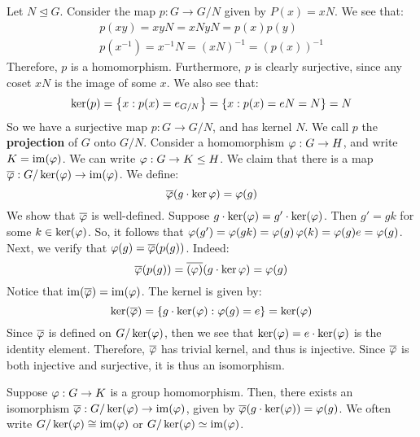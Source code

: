 Let $ N \trianglelefteq G $. Consider the map $ p : G \rightarrow G/N $ given by $ P(x) = xN $.
We see that:
\begin{gather*}
    p(xy) = xyN = xNyN = p(x)p(y) \\
    p(x^{-1}) = x^{-1}N = (xN)^{-1} = (p(x))^{-1}
\end{gather*}
Therefore, $ p $ is a homomorphism. Furthermore, $ p $ is clearly surjective,
since any coset $ xN $ is the image of some $ x $. We also see that:
\begin{equation*}
    \ker(p) = \left\{{x : p(x) = e_{G/N}}\right\} = \left\{{x : p(x) = eN = N}\right\} = N
\end{equation*}
So we have a surjective map $ p: G \rightarrow G/N $, and has kernel $ N $.
We call $ p $ the \textbf{projection} of $ G $ onto $ G/N $. \vsp
%
Consider a homomorphism $ \operatorname{\varphi}: G \rightarrow H $, and write $ K = \operatorname{im}(\operatorname{\varphi}) $.
We can write $ \operatorname{\varphi} : G \rightarrow K \leq H $.
We claim that there is a map $ \overline{\operatorname{\varphi}} : G/\ker(\operatorname{\varphi}) \rightarrow \operatorname{im}(\operatorname{\varphi}) $.
We define:
\begin{equation*}
    \overline{\operatorname{\varphi}}(g \cdot \ker\operatorname{\varphi}) = \operatorname{\varphi}(g)
\end{equation*}
We show that $ \overline{\operatorname{\varphi}} $ is well-defined. Suppose $ g \cdot \ker(\operatorname{\varphi}) = g' \cdot \ker(\operatorname{\varphi}) $.
Then $ g' = gk $ for some $ k \in \ker(\operatorname{\varphi}) $.
So, it follows that $ \operatorname{\varphi}(g') = \operatorname{\varphi}(gk) = \operatorname{\varphi}(g)\operatorname{\varphi}(k) = \operatorname{\varphi}(g)e = \operatorname{\varphi}(g) $.
Next, we verify that $ \operatorname{\varphi}(g) = \overline{\operatorname{\varphi}}(p(g)) $. Indeed:
\begin{equation*}
    \overline{\operatorname{\varphi}}(p(g)) = \overline{(\operatorname{\varphi})}(g \cdot \ker \operatorname{\varphi}) = \operatorname{\varphi}(g)
\end{equation*}
Notice that $ \operatorname{im}(\overline{\operatorname{\varphi}}) = \operatorname{im}(\operatorname{\varphi}) $.
The kernel is given by:
\begin{equation*}
    \ker(\overline{\operatorname{\varphi}}) = \left\{{g \cdot \ker(\operatorname{\varphi}) : \operatorname{\varphi}(g) = e}\right\} = \ker(\operatorname{\varphi})
\end{equation*}
Since $ \overline{\operatorname{\varphi}} $ is defined on $ G/\ker(\operatorname{\varphi}) $,
then we see that $ \ker(\operatorname{\varphi}) = e \cdot \ker(\operatorname{\varphi}) $ is the identity element.
Therefore, $ \overline{\operatorname{\varphi}} $ has trivial kernel, and thus is injective. \vsp
%
Since $ \overline{\operatorname{\varphi}} $ is both injective and surjective, it is thus an isomorphism.

\begin{thm}[title=First Isomorphism Theorem]
    Suppose $ \operatorname{\varphi}: G \rightarrow K $ is a group homomorphism. \vsp
    Then, there exists an isomorphism $ \overline{\operatorname{\varphi}} : G/\ker(\operatorname{\varphi}) \rightarrow \operatorname{im}(\operatorname{\varphi}) $,
    given by $ \overline{\operatorname{\varphi}}(g \cdot \ker(\operatorname{\varphi})) = \operatorname{\varphi}(g) $. \vsp
    We often write $ G/\ker(\operatorname{\varphi}) \cong \operatorname{im}(\operatorname{\varphi}) $ or $ G/\ker(\operatorname{\varphi}) \simeq \operatorname{im}(\operatorname{\varphi}) $.
\end{thm}

